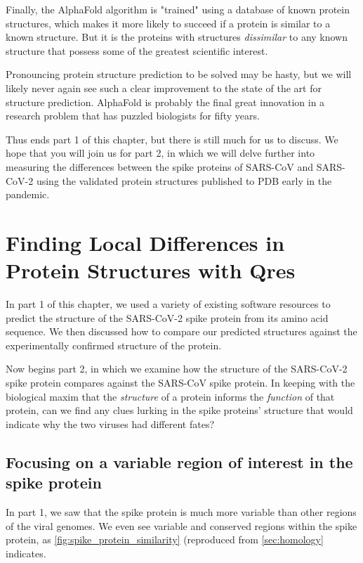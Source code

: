 {{Finally, the AlphaFold algorithm is "trained" using a database of known protein structures, which makes it more likely to succeed if a protein is similar to a known structure. But it is the proteins with structures \textit{dissimilar} to any known structure that possess some of the greatest scientific interest.

Pronouncing protein structure prediction to be solved may be hasty, but we will likely never again see such a clear improvement to the state of the art for structure prediction. AlphaFold is probably the final great innovation in a research problem that has puzzled biologists for fifty years.

Thus ends part 1 of this chapter, but there is still much for us to discuss. We hope that you will join us for part 2, in which we will delve further into measuring the differences between the spike proteins of SARS-CoV and SARS-CoV-2 using the validated protein structures published to PDB early in the pandemic.

\FloatBarrier
{}

\section{Finding Local Differences in Protein Structures with Qres}
\label{sec:multiseq}

In part 1 of this chapter, we used a variety of existing software resources to predict the structure of the SARS-CoV-2 spike protein from its amino acid sequence. We then discussed how to compare our predicted structures against the experimentally confirmed structure of the protein.

Now begins part 2, in which we examine how the structure of the SARS-CoV-2 spike protein compares against the SARS-CoV spike protein. In keeping with the biological maxim that the \textit{structure} of a protein informs the \textit{function} of that protein, can we find any clues lurking in the spike proteins' structure that would indicate why the two viruses had different fates?

\FloatBarrier
{}
\subsection{Focusing on a variable region of interest in the spike protein}

In part 1, we saw that the spike protein is much more variable than other regions of the viral genomes. We even see variable and conserved regions within the spike protein, as \autoref{fig:spike_protein_similarity} (reproduced from \autoref{sec:homology} indicates.

}}
